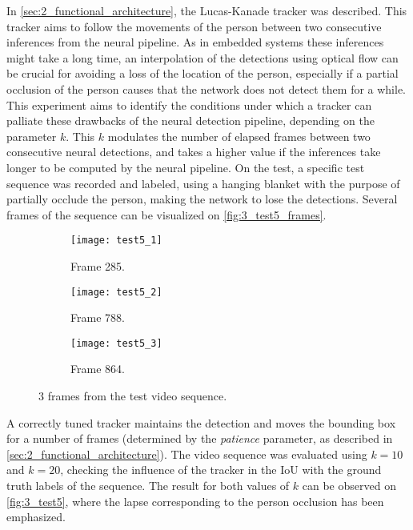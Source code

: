 \label{sec:3_test5}
In \autoref{sec:2_functional_architecture}, the Lucas-Kanade tracker was described. This tracker aims to follow the movements of the person between two consecutive inferences from the neural pipeline. As in embedded systems these inferences might take a long time, an interpolation of the detections using optical flow can be crucial for avoiding a loss of the location of the person, especially if a partial occlusion of the person causes that the network does not detect them for a while.\\

This experiment aims to identify the conditions under which a tracker can palliate these drawbacks of the neural detection pipeline, depending on the parameter $k$. This $k$ modulates the number of elapsed frames between two consecutive neural detections, and takes a higher value if the inferences take longer to be computed by the neural pipeline. On the test, a specific test sequence was recorded and labeled, using a hanging blanket with the purpose of partially occlude the person, making the network to lose the detections. Several frames of the sequence can be visualized on \autoref{fig:3_test5_frames}.\\


\begin{figure}[h]
	\centering
	\begin{subfigure}[b]{0.3\linewidth}
		\centering
		\texttt{[image: test5\_1]}
		\caption{Frame 285.}
	\end{subfigure}
	\begin{subfigure}[b]{0.3\linewidth}
		\centering
		\texttt{[image: test5\_2]}
		\caption{Frame 788.}
	\end{subfigure}
	\begin{subfigure}[b]{0.3\linewidth}
		\centering
		\texttt{[image: test5\_3]}
		\caption{Frame 864.}
	\end{subfigure}
	\caption{3 frames from the test video sequence.}
	\label{fig:3_test5_frames}
\end{figure}



A correctly tuned tracker maintains the detection and moves the bounding box for a number of frames (determined by the \textit{patience} parameter, as described in \autoref{sec:2_functional_architecture}). The video sequence was evaluated using $k=10$ and $k=20$, checking the influence of the tracker in the IoU with the ground truth labels of the sequence. The result for both values of $k$ can be observed on \autoref{fig:3_test5}, where the lapse corresponding to the person occlusion has been emphasized.

